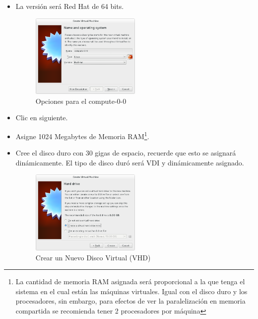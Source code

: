 \begin{enumerate}
\begin{itemize}
	\item La versión será Red Hat de 64 bits.

	
	\begin{figure}[H]
		\centering
		\includegraphics[width=0.5\textwidth]{aux/opcnodo1}
		\caption{Opciones para el compute-0-0}
	\end{figure}
	
	\item Clic en siguiente.

	\item Asigne 1024 Megabytes de Memoria RAM\footnote{La cantidad de memoria RAM asignada será proporcional a la que tenga el sistema en el cual están las máquinas virtuales. Igual con el disco duro y los procesadores, sin embargo, para efectos de ver la paralelización en memoria compartida se recomienda tener 2 procesadores por máquina}.

	\item Cree el disco duro con 30 gigas de espacio, recuerde que esto se asignará dinámicamente. El tipo de disco duró será VDI y dinámicamente asignado.



	
	\begin{figure}[H]
		\centering
		\includegraphics[width=0.5\textwidth]{aux/nodohd}
		\caption{Crear un Nuevo Disco Virtual (VHD)}
	\end{figure}
	


\end{itemize}
\end{enumerate}

